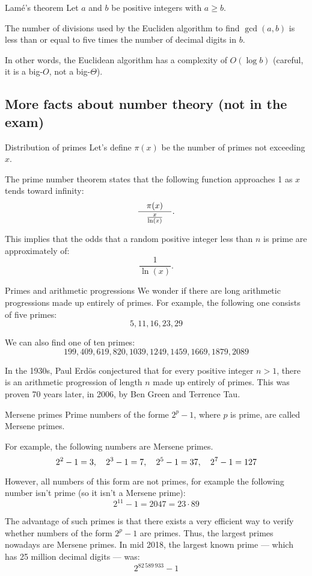 \documentclass[a4paper]{article}
\begin{document}
\begin{parag}{Lamé's theorem}
    Let $a$ and $b$ be positive integers with $a \geq b$. 

    The number of divisions used by the Eucliden algorithm to find $\gcd\left(a, b\right)$ is less than or equal to five times the number of decimal digits in $b$. 

    In other words, the Euclidean algorithm has a complexity of $O\left(\log b\right)$ (careful, it is a big-$O$, not a big-$\Theta$).
\end{parag}

\subsection{More facts about number theory (not in the exam)}

\begin{parag}{Distribution of primes}
    Let's define $\pi\left(x\right)$ be the number of primes not exceeding $x$.

    The prime number theorem states that the following function approaches 1 as $x$ tends toward infinity:
    \[\frac{\pi\left(x\right)}{\mathspace \frac{x}{\ln\left(x\right)} \mathspace}.\]

    This implies that the odds that a random positive integer less than $n$ is prime are approximately of:
    \[\frac{1}{\ln\left(x\right)}.\]
\end{parag}

\begin{parag}{Primes and arithmetic progressions}
    We wonder if there are long arithmetic progressions made up entirely of primes. For example, the following one consists of five primes: 
    \[5, 11, 16, 23, 29\]

    We can also find one of ten primes: 
    \[199, 409, 619, 820, 1039, 1249, 1459, 1669, 1879, 2089\]
    
    In the 1930s, Paul Erdös conjectured that for every positive integer $n > 1$, there is an arithmetic progression of length $n$ made up entirely of primes. This was proven 70 years later, in 2006, by Ben Green and Terrence Tau.
\end{parag}

\begin{parag}{Mersene primes}
    Prime numbers of the forme $2^p - 1$, where $p$ is prime, are called Mersene primes.

    For example, the following numbers are Mersene primes. 
    \[2^2 - 1 = 3, \quad 2^3 - 1 = 7, \quad 2^5 - 1 = 37, \quad 2^7 - 1 = 127\]
    
    However, all numbers of this form are not primes, for example the following number isn't prime (so it isn't a Mersene prime):
    \[2^{11} - 1 = 2047 = 23\cdot 89\]

    The advantage of such primes is that there exists a very efficient way to verify whether numbers of the form $2^p - 1$ are primes. Thus, the largest primes nowadays are Mersene primes. In mid 2018, the largest known prime --- which has 25 million decimal digits --- was: 
    \[2^{82\,589\,933} - 1\]
\end{parag}
\end{document}
